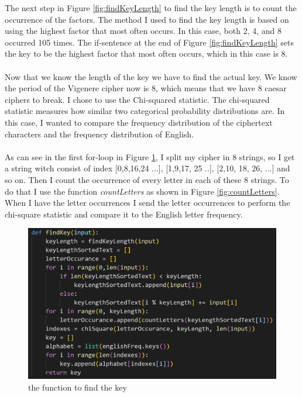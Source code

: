 \documentclass[12pt, letterpaper]{article}
\begin{document}
The next step in Figure \ref{fig:findKeyLength} to find the key length is to count the occurrence of the factors. The method I used to find the key length is based on using the highest factor that most often occurs. In this case, both 2, 4, and 8 occurred 105 times. The if-sentence at the end of Figure \ref{fig:findKeyLength} sets the key to be the highest factor that most often occurs, which in this case is 8.
\\ \\
Now that we know the length of the key we have to find the actual key. We know the period of the Vigenere cipher now is 8, which means that we have 8 caesar ciphers to break. I chose to use the Chi-squared statistic. The chi-squared statistic measures how similar two categorical probability distributions are. In this case, I wanted to compare the frequency distribution of the ciphertext characters and the frequency distribution of English.
\\ \\
As can see in the first for-loop in Figure \ref{fig:findKey}, I split my cipher in 8 strings, so I get a string witch consist of index [0,8,16,24 ...], [1,9,17, 25 ..], [2,10, 18, 26, ...] and so on. Then I count the occurrence of every letter in each of these 8 strings. To do that I use the function \textit{countLetters} as shown in Figure \ref{fig:countLetters}. When I have the letter occurrences I send the letter occurrences to perform the chi-square statistic and compare it to the English letter frequency.

\begin{figure}[H]
  \includegraphics[width=\linewidth]{code_snippets/findKey.PNG}
  \caption{the function to find the key}
  \label{fig:findKey}
\end{figure}
\end{document}
